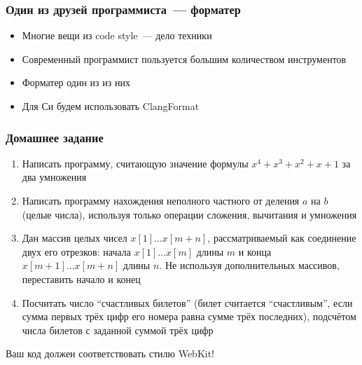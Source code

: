 \documentclass[aspectratio=169]{beamer}
\begin{document}
\begin{frame}
    \frametitle{Один из друзей программиста~--- форматер}

    \begin{itemize}
        \item Многие вещи из code style~--- дело техники
        \item Современный программист пользуется большим количеством инструментов
        \item Форматер один из из них
        \item Для Си будем использовать ClangFormat
    \end{itemize}

\end{frame}


\begin{frame}
    \frametitle{Домашнее задание}

    \begin{enumerate}
        \item Написать программу, считающую значение формулы $x^4 + x^3 + x^2 + x + 1$ за два умножения
        \item Написать программу нахождения неполного частного от деления $a$ на $b$ (целые числа), используя только операции сложения, вычитания и умножения
        \item Дан массив целых чисел $x[1] \dots x[m + n]$, рассматриваемый как соединение двух его отрезков: начала $x[1] \dots x[m]$ длины $m$ и конца $x[m + 1] \dots x[m + n]$ длины $n$.
              Не используя дополнительных массивов, переставить начало и конец %
        \item Посчитать число \enquote{счастливых билетов} (билет считается \enquote{счастливым}, если сумма первых трёх цифр его номера равна сумме трёх последних), подсчётом числа билетов с заданной суммой трёх цифр
    \end{enumerate}

    \alert{Ваш код должен соответствовать стилю WebKit!}
\end{frame}
\end{document}

